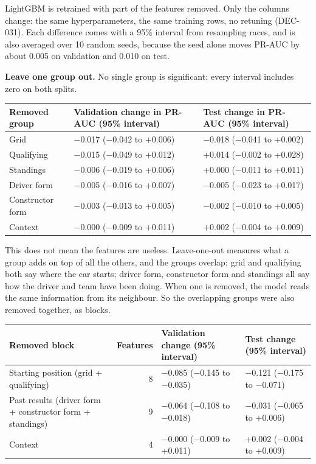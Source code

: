 \documentclass[11pt,a4paper]{article}
\begin{document}
LightGBM is retrained with part of the features removed. Only the columns change: the same hyperparameters, the same training rows, no retuning (DEC-031). Each difference comes with a 95\% interval from resampling races, and is also averaged over 10 random seeds, because the seed alone moves PR-AUC by about 0.005 on validation and 0.010 on test.

\textbf{Leave one group out.} No single group is significant: every interval includes zero on both splits.

{\small
\begin{xltabular}{\linewidth}{>{\raggedright\arraybackslash}X>{\raggedright\arraybackslash}X>{\raggedright\arraybackslash}X}
\toprule
\textbf{Removed group} & \textbf{Validation change in PR-AUC (95\% interval)} & \textbf{Test change in PR-AUC (95\% interval)} \\
\midrule
\endhead
Grid & −0.017 (−0.042 to +0.006) & −0.018 (−0.041 to +0.002) \\
Qualifying & −0.015 (−0.049 to +0.012) & +0.014 (−0.002 to +0.028) \\
Standings & −0.006 (−0.019 to +0.006) & +0.000 (−0.011 to +0.011) \\
Driver form & −0.005 (−0.016 to +0.007) & −0.005 (−0.023 to +0.017) \\
Constructor form & −0.003 (−0.013 to +0.005) & −0.002 (−0.010 to +0.005) \\
Context & −0.000 (−0.009 to +0.011) & +0.002 (−0.004 to +0.009) \\
\bottomrule
\end{xltabular}
}

This does not mean the features are useless. Leave-one-out measures what a group adds on top of all the others, and the groups overlap: grid and qualifying both say where the car starts; driver form, constructor form and standings all say how the driver and team have been doing. When one is removed, the model reads the same information from its neighbour. So the overlapping groups were also removed together, as blocks.

{\small
\begin{xltabular}{\linewidth}{>{\raggedright\arraybackslash}Xr>{\raggedright\arraybackslash}X>{\raggedright\arraybackslash}X}
\toprule
\textbf{Removed block} & \textbf{Features} & \textbf{Validation change (95\% interval)} & \textbf{Test change (95\% interval)} \\
\midrule
\endhead
Starting position (grid + qualifying) & 8 & −0.085 (−0.145 to −0.035) & −0.121 (−0.175 to −0.071) \\
Past results (driver form + constructor form + standings) & 9 & −0.064 (−0.108 to −0.018) & −0.031 (−0.065 to +0.006) \\
Context & 4 & −0.000 (−0.009 to +0.011) & +0.002 (−0.004 to +0.009) \\
\bottomrule
\end{xltabular}
}
\end{document}
